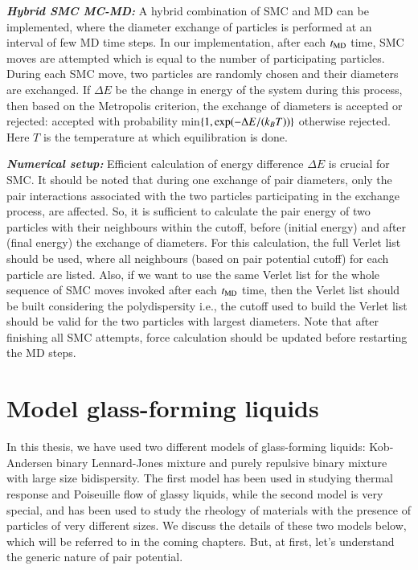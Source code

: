 {\bf \em Hybrid SMC MC-MD:} A hybrid combination of SMC and MD \cite{berthier2019,ozawa2018random} can be implemented, where the diameter exchange of particles is performed at an interval of few MD time steps. In our implementation, after each $t_{\rm MD}$ time, SMC moves are attempted which is equal to the number of participating particles. During each SMC move, two particles are randomly chosen and their diameters are exchanged. If $\Delta E$ be the change in energy of the system during this process, then based on the Metropolis criterion, the exchange of diameters is accepted or rejected: accepted with probability min$\{1, {\rm exp}(-\Delta E/ (k_B T))\}$ otherwise rejected. Here $T$ is the temperature at which equilibration is done.
    
{\bf \em Numerical setup:} Efficient calculation of energy difference $\Delta E$ is crucial for SMC. It should be noted that during one exchange of pair diameters, only the pair interactions associated with the two particles participating in the exchange process, are affected. So, it is sufficient to calculate the pair energy of two particles with their neighbours within the cutoff, before (initial energy) and after (final energy) the  exchange of diameters. For this calculation, the full Verlet list should be used, where all neighbours (based on pair potential cutoff) for each particle are listed. Also, if we want to use the same Verlet list for the whole sequence of SMC moves invoked after each $t_{\rm MD}$ time, then the Verlet list should be built considering the polydispersity i.e., the cutoff used to build the Verlet list should be valid for the two particles with largest diameters. Note that after finishing all SMC attempts, force calculation should be updated before restarting the MD steps.
    
\section{Model glass-forming liquids}\label{model}
In this thesis, we have used two different models of glass-forming liquids: Kob-Andersen binary Lennard-Jones mixture and purely repulsive binary mixture with large size bidispersity. The first model has been used in studying thermal response and Poiseuille flow of glassy liquids, while the second model is very special, and has been used to study the rheology of materials with the presence of particles of very different sizes. We discuss the details of these two models below, which will be referred to in the coming chapters. But, at first, let's understand the generic nature of pair potential.

